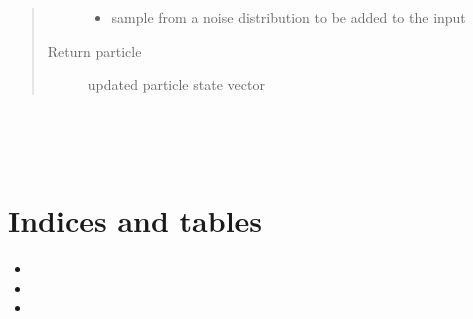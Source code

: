 \documentclass[letterpaper,10pt,english]{sphinxmanual}
\begin{document}
\begin{fulllineitems}
\begin{fulllineitems}
\begin{quote}
\begin{description}
\begin{itemize}
\item {} 
\sphinxAtStartPar
{} \textendash{} sample from a noise distribution to be added to the input

\end{itemize}

\item[{Return particle}] \leavevmode
\sphinxAtStartPar
updated particle state vector

\end{description}\end{quote}

\end{fulllineitems}


\end{fulllineitems}



\begin{savenotes}\sphinxatlongtablestart\begin{longtable}[c]{}
\hline

\endfirsthead

%
{}\\
\hline

\endhead

\hline
{}\\
\endfoot

\endlastfoot

\end{longtable}\sphinxatlongtableend\end{savenotes}


\chapter{Indices and tables}
\label{\detokenize{index:indices-and-tables}}\begin{itemize}
\item {} 
\sphinxAtStartPar
{}

\item {} 
\sphinxAtStartPar
{}

\item {} 
\sphinxAtStartPar
{}

\end{itemize}



\renewcommand{\indexname}{Index}
\printindex
\end{document}
